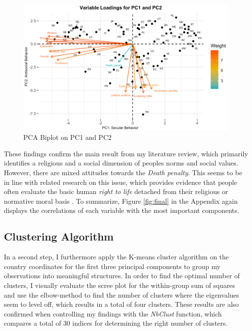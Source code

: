 \documentclass{article}[hidelinks]
\begin{document}
\begin{figure}[h]
    \centering
    \includegraphics[width=120mm]{variables_PCA_final.png}
    \caption{PCA Biplot on PC1 and PC2}
    \label{fig:biplot}
\end{figure} These findings confirm the main result from my literature review, which primarily identifies a religious and a social dimension of peoples norms and social values. However, there are mixed attitudes towards the \emph{Death penalty}. This seems to be in line with related research on this issue, which provides evidence that people often evaluate the basic human \emph{right to life} detached from their religious or normative moral basis \citep{hood2015death, anckar2004determinants}. To summarize, Figure \ref{fig:final} in the Appendix again displays the correlations of each variable with the most important components.

\subsection{Clustering Algorithm}

In a second step, I furthermore apply the K-means cluster algorithm on the country coordinates for the first three principal components to group my observations into meaningful structures. In order to find the optimal number of clusters, I visually evaluate the scree plot for the within-group sum of squares and use the elbow-method to find the number of clusters where the eigenvalues seem to level off, which results in a total of four clusters. These results are also confirmed when controlling my findings with the \emph{NbClust} function, which compares a total of 30 indices for determining the right number of clusters. 
\end{document}
